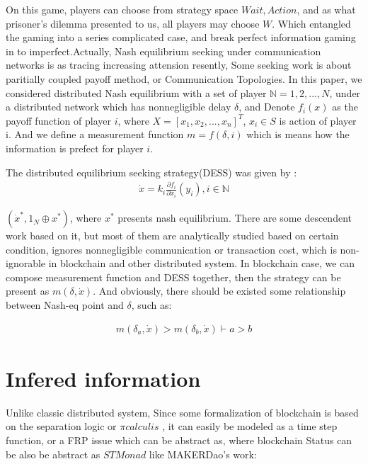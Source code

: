 \documentclass[twocolumn]{article}
\begin{document}
On this game, players can choose from strategy space ${Wait, Action}$, and as what prisoner's dilemma presented to us, all players may choose $W$. Which entangled the gaming into a series complicated case, and break perfect information gaming in to imperfect.Actually, Nash equilibrium seeking under communication networks is as tracing increasing attension resently, Some seeking work is about paritially coupled payoff method\cite{8029164}, or Communication Topologies\cite{8093754}. In this paper, we considered distributed Nash equilibrium with a set of player $\mathbb{N} = {1, 2, ..., N}$, under a distributed network which has nonnegligible delay $\mathbb{\delta}$, and Denote $f_i(x)$ as the payoff function of player $i$, where $X = [x_1, x_2, ..., x_n]^T$, $x_i \in S$ is action of player i. And we define a measurement function $m = f(\delta, i)$ which is means how the information is prefect for player $i$.

The distributed equilibrium seeking strategy(DESS) was given by \cite{7888532}:
\begin{gather}
  \dot{x} = k_i \frac {\partial f_i}{\partial x_i}(y_i), i \in \mathbb{N}
\end{gather}

$(\dot{x}^*, 1_N\oplus x^*)$, where $x^*$ presents nash equilibrium. There are some descendent work based on it, but most of them are analytically studied based on certain condition, ignores nonnegligible communication or transaction cost, which is non-ignorable in blockchain and other distributed system. In blockchain case, we can compose measurement function and DESS together, then the strategy can be present as $m(\delta, \dot{x})$. And obviously, there should be existed some relationship between Nash-eq point and $\delta$, such as:

\begin{gather}
  m(\delta_a, \dot{x}) > m(\delta_b, \dot{x}) \vdash a > b
\end{gather}

\section{Infered information}

Unlike classic distributed system,
Since some formalization of blockchain is based on the separation logic or $\pi calculis$ \cite{linearblockchain}, it can easily be modeled as a time step function, or a FRP issue which can be abstract as\cite{ElliottHudak97:Fran}, where blockchain Status can be also be abstract as $STMonad$ like MAKERDao\cite{dai}'s work:
\end{document}
